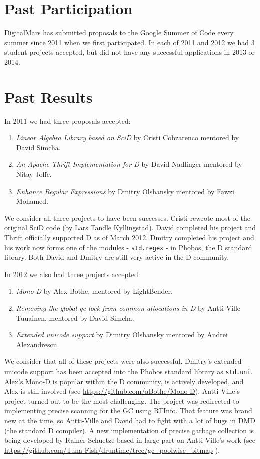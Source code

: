 \documentclass[	DIV=calc,paper=a4,fontsize=11pt,twocolumn]{scrartcl}	%
\begin{document}
\section{Past Participation}

DigitalMars has submitted proposals to the Google Summer of Code every
summer since 2011 when we first participated. In each of 2011 and 2012
we had 3 student projects accepted, but did not have any successful 
applications in 2013 or 2014.

\section{Past Results}

In 2011 we had three proposals accepted:

\begin{enumerate}
\item \emph{Linear Algebra Library based on SciD} by Cristi Cobzarenco 
 mentored by David Simcha.
\item \emph{An Apache Thrift Implementation for D} by David Nadlinger mentored 
by Nitay Joffe.
\item \emph{Enhance Regular Expressions} by Dmitry Olshansky mentored by
Fawzi Mohamed.
\end{enumerate}

We consider all three projects to have been successes. Cristi rewrote most of the 
original SciD code (by Lars Tandle Kyllingstad).  David completed his project 
and Thrift officially supported D as of March 2012.  Dmitry completed his project 
and his work  now forms one of the modules - \texttt{std.regex} - in Phobos, the D
standard library. Both David and Dmitry are still very active in the D community.

In 2012 we also had three projects accepted:

\begin{enumerate}
  \item \emph{Mono-D} by Alex Bothe, mentored by LightBender.
  \item \emph{Removing the global gc lock from common allocations in D} by 
  Antti-Ville Tuuainen, mentored by David Simcha.
  \item \emph{Extended unicode support} by Dimitry Olshansky mentored by
  Andrei Alexandrescu.
\end{enumerate}

We consider that all of these projects were also successful.  Dmitry's extended
unicode support has been accepted into the Phobos standard library as \texttt{std.uni}.
Alex's Mono-D is popular within the D community, is actively developed, and
Alex is still involved (see \url{https://github.com/aBothe/Mono-D}). Antti-Ville's project
turned out to be the most challenging.  The project was redirected to implementing
precise scanning for the GC using RTInfo.  That feature was brand new at the time, so
Antti-Ville and David had to fight with a lot of bugs in DMD (the standard D compiler).
A new implementation of precise garbage collection is being developed by Rainer Schuetze
based in large part on Antti-Ville's work (see 
\url{https://github.com/Tuna-Fish/druntime/tree/gc_poolwise_bitmap} ).
\end{document}
